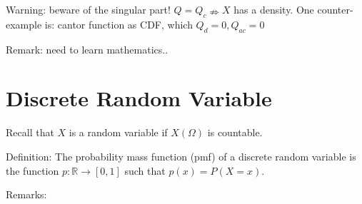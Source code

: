 \documentclass[12pt]{article}
\begin{document}
Warning: beware of the singular part! $Q=Q_c \nRightarrow X$ has a density.
One counter-example is: cantor function as CDF, which $Q_d=0,Q_{ac}=0$
\bigbreak

Remark: need to learn mathematics..

\section{Discrete Random Variable}

Recall that $X$ is a random variable if $X(\Omega)$ is countable.

Definition: The probability mass function (pmf) of a discrete random variable
is the function $p:\mathbb{R}\rightarrow [0,1]$ such that $p(x)=P(X=x)$.

Remarks:
\end{document}
